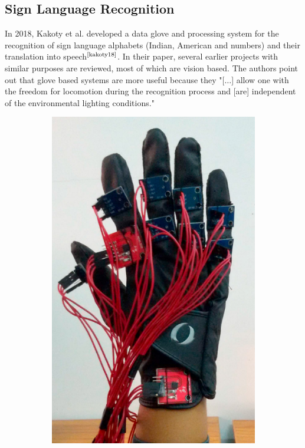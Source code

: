 \documentclass[hyperref, bachelorofscience]{cgvpub}
\newcommand{\newcite}[1]{$ ^{\text{\cite{#1}}} $}
\begin{document}
\subsection{Sign Language Recognition}
In 2018, Kakoty et al. developed a data glove and processing system for the recognition of sign language alphabets (Indian, American and numbers) and their translation into speech\newcite{kakoty18}. In their paper, several earlier projects with similar purposes are reviewed, most of which are vision based. The authors point out that glove based systems are more useful because they "[$\dots$] allow one with the freedom for locomotion during the recognition process and [are] independent of the environmental lighting conditions."

\begin{figure}[b!]
	\centering
	\begin{subfigure}{.347\linewidth}
		\includegraphics[width=\linewidth]{../pics/kakoty_glove}

\end{subfigure}
\end{figure}
\end{document}
